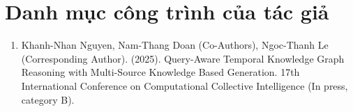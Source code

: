\chapter*{Danh mục công trình của tác giả}
\label{Appendix1}

\begin{enumerate}
\item Khanh-Nhan Nguyen, Nam-Thang Doan (Co-Authors), Ngoc-Thanh Le (Corresponding Author). (2025). Query-Aware Temporal Knowledge Graph Reasoning with Multi-Source Knowledge Based Generation. 17th International Conference on Computational Collective Intelligence (In press, category B).
\end{enumerate}